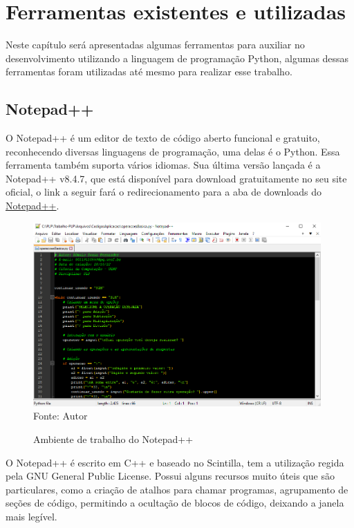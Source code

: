 

\chapter{Ferramentas existentes e utilizadas}

Neste capítulo será apresentadas algumas ferramentas para auxiliar no desenvolvimento utilizando a linguagem de programação Python, algumas dessas ferramentas foram utilizadas até mesmo para realizar esse trabalho.

    \section{Notepad++}
	O Notepad++ é um editor de texto de código aberto funcional e gratuito, reconhecendo diversas linguagens de programação, uma delas é o Python. Essa ferramenta também suporta vários idiomas. Sua última versão lançada é a Notepad++ v8.4.7, que está disponível para download gratuitamente no seu site oficial, o link a seguir fará o redirecionamento para a aba de downloads do \href{https://notepad-plus-plus.org/downloads/}{Notepad++}. 
	
	\begin{figure}[H]
		\begin{center}
			\caption{Ambiente de trabalho do Notepad++} \label{ling1}
			\includegraphics[width=11cm]{note.PNG} \\
			{\tiny \sf Fonte:{ Autor}}
		\end{center}
	\end{figure}
	
		
	O Notepad++ é escrito em C++ e baseado no Scintilla, tem a utilização regida pela GNU General Public License. Possui alguns recursos muito úteis que são particulares, como a criação de atalhos para chamar programas, agrupamento de seções de código, permitindo a ocultação de blocos de código, deixando a janela mais legível.
	
